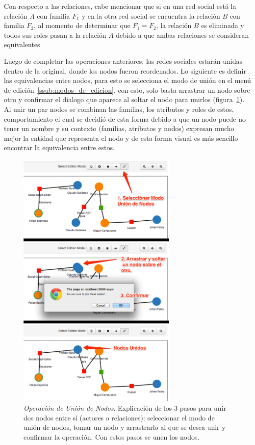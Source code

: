 Con respecto a las relaciones, cabe mencionar que si en una red social está la relación $A$ con familia $F_1$ y en la otra red social se encuentra la relación $B$ con familia $F_2$, al momento de determinar que $F_1 = F_2$, la relación $B$ es eliminada y todos sus roles pasan a la relación $A$ debido a que ambas relaciones se consideran equivalentes

Luego de completar las operaciones anteriores, las redes sociales estarán unidas dentro de la original, donde los nodos fueron reordenados. Lo siguiente es definir las equivalencias entre nodos, para esto se selecciona el modo de unión en el menú de edición~\ref{ssub:modos_de_edicion}, con esto, solo basta arrastrar un nodo sobre otro y confirmar el dialogo que aparece al soltar el nodo para unirlos (figura~\ref{node_join}). Al unir un par nodos se combinan las familias, los atributos y roles de estos, comportamiento el cual se decidió de esta forma debido a que un nodo puede no tener un nombre y su contexto (familias, atributos y nodos) expresan mucho mejor la entidad que representa el nodo y de esta forma visual es más sencillo encontrar la equivalencia entre estos.

\begin{figure}[H]
  \centering
  \includegraphics[width=0.7\textwidth]{images/node_join.png}
  \caption[Operación de Unión de Nodos]{\emph{Operación de Unión de Nodos}. Explicación de los 3 pasos para unir dos nodos entre sí (actores o relaciones): seleccionar el modo de unión de nodos, tomar un nodo y arrastrarlo al que se desea unir y confirmar la operación. Con estos pasos se unen los nodos.}
  \label{node_join}
\end{figure}


